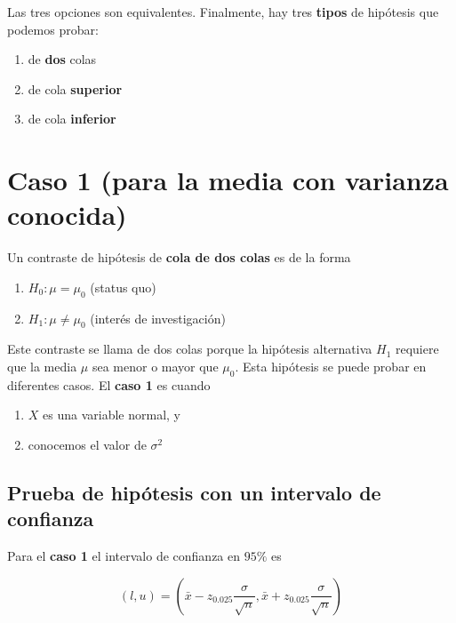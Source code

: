 \documentclass[
]{book}
\providecommand{\tightlist}{%
  \setlength{\itemsep}{0pt}\setlength{\parskip}{0pt}}
\begin{document}
Las tres opciones son equivalentes. Finalmente, hay tres \textbf{tipos} de hipótesis que podemos probar:

\begin{enumerate}
\def\labelenumi{\arabic{enumi}.}
\tightlist
\item
  de \textbf{dos} colas
\item
  de cola \textbf{superior}
\item
  de cola \textbf{inferior}
\end{enumerate}

\hypertarget{caso-1-para-la-media-con-varianza-conocida}{%
\section{Caso 1 (para la media con varianza conocida)}\label{caso-1-para-la-media-con-varianza-conocida}}

Un contraste de hipótesis de \textbf{cola de dos colas} es de la forma

\begin{enumerate}
\def\labelenumi{\alph{enumi}.}
\tightlist
\item
  \(H_0:\mu = \mu_0\) (status quo)
\item
  \(H_1:\mu \neq \mu_0\) (interés de investigación)
\end{enumerate}

Este contraste se llama de dos colas porque la hipótesis alternativa \(H_1\) requiere que la media \(\mu\) sea menor o mayor que \(\mu_0\). Esta hipótesis se puede probar en diferentes casos. El \textbf{caso 1} es cuando

\begin{enumerate}
\def\labelenumi{\arabic{enumi}.}
\tightlist
\item
  \(X\) es una variable normal, y
\item
  conocemos el valor de \(\sigma^2\)
\end{enumerate}

\hypertarget{prueba-de-hipuxf3tesis-con-un-intervalo-de-confianza}{%
\subsection{Prueba de hipótesis con un intervalo de confianza}\label{prueba-de-hipuxf3tesis-con-un-intervalo-de-confianza}}

Para el \textbf{caso 1} el intervalo de confianza en \(95\%\) es

\[(l,u)=(\bar{x}-z_{0.025} \frac{\sigma}{\sqrt{n}}, \bar{x}+z_{0.025} \frac{\sigma}{ \sqrt{n}})\]
\end{document}
